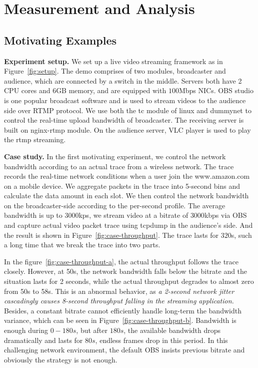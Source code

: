 \section{Measurement and Analysis}
\subsection{Motivating Examples}

\textbf{Experiment setup.} We set up a live video streaming framework as in Figure~\ref{fig:setup}. The demo comprises of two modules, broadcaster and audience, which are connected by a switch in the middle. Servers both have 2 CPU cores and 6GB memory, and are equipped with $100$Mbps NICs. OBS studio\cite{OBS} is one popular broadcast software and is used to stream videos to the audience side over RTMP protocol. We use both the tc module of linux and dummynet\cite{dummynet} to control the real-time upload bandwidth of broadcaster. The receiving server is built on nginx-rtmp module. On the audience server, VLC player is used to play the rtmp streaming.


\textbf{Case study.} In the first motivating experiment, we control the network bandwidth according to an actual trace from a wireless network. The trace records the real-time network conditions when a user join the www.amazon.com on a mobile device. We aggregate packets in the trace into 5-second bins and calculate the data amount in each slot. We then control the network bandwidth on the broadcaster-side according to the per-second profile. The average bandwidth is up to $3000$kps, we stream video at a bitrate of $3000$kbps via OBS and capture actual video packet trace using tcpdump in the audience's side. And the result is shown in Figure~\ref{fig:case-throughput}.  The trace lasts for $320$s, such a long time that we break the trace into two parts.

In the figure~\ref{fig:case-throughput-a}, the actual throughput follows the trace closely. However, at 50s, the network bandwidth falls below the bitrate and the situation lasts for 2 seconds, while the actual throughput degrades to almost zero from 50s to 58s. This is an abnormal behavior, as \textit{a 2-second network jitter cascadingly causes 8-second throughput falling in the streaming application.} Besides, a constant bitrate cannot efficiently handle long-term the bandwidth variance, which can be seen in Figure~\ref{fig:case-throughput-b}. Bandwidth is enough during $0-180s$, but after $180s$, the available bandwidth drops dramatically and lasts for $80s$, endless frames drop in this period. In this challenging network environment, the default OBS insists previous bitrate and obviously the strategy is not enough.

